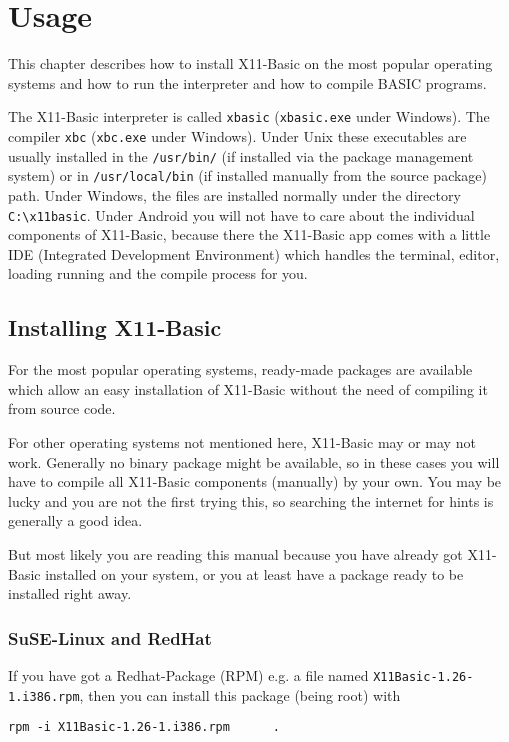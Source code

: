 \chapter{Usage}

This chapter describes how to install X11-Basic on the most popular operating 
systems and how to run the interpreter and how to compile BASIC programs.

The X11-Basic interpreter is called \verb|xbasic| (\verb|xbasic.exe| under 
Windows). The compiler \verb|xbc| (\verb|xbc.exe| under  Windows). Under Unix
these executables are usually installed in the \verb|/usr/bin/| (if installed
via  the package management system) or in \verb|/usr/local/bin|  (if installed
manually from the source package) path. Under Windows, the files are installed
normally under the directory \verb|C:\x11basic|. Under Android you will not have
to care about the individual components of X11-Basic,  because there the
X11-Basic app comes with a little IDE  (Integrated Development Environment)
which handles the terminal, editor, loading running and the compile process 
for you.

\section{Installing X11-Basic}

For the most popular operating systems, ready-made packages are  available which
allow an easy installation of X11-Basic without the  need of compiling it from
source code. 

For other operating systems not mentioned here, X11-Basic may or may not work. 
Generally no binary package might be available, so in these cases you will have 
to compile all X11-Basic components (manually) by your own. You may be lucky 
and you are not the first trying this, so searching the internet for hints is 
generally a good idea.

But most likely you are reading this manual because you have already got 
X11-Basic installed on your system, or you at least have a package ready 
to be installed right away.

\subsection*{SuSE-Linux and RedHat}

If you have got a Redhat-Package (RPM) e.g. a file named 
\verb|X11Basic-1.26-1.i386.rpm|, then you can install this package (being
root) with 
\begin{verbatim}
rpm -i X11Basic-1.26-1.i386.rpm      .
\end{verbatim}


